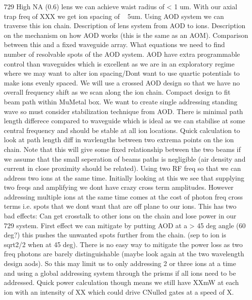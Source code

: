 \documentclass[12pt]{iopart}
\begin{document}
729 High NA (0.6) lens we can achieve waist radius of < 1 um.  With
our axial trap freq of XXX we get ion spacing of ~ 5um.  Using AOD
system we can traverse this ion chain.  Description of lens system
from AOD to ions.
Description on the mechanism on how AOD works (this is the same as an
AOM). Comparison between this and a fixed waveguide array. What
equations we need to find number of resolvable spots of the AOD
system. AOD have extra programmable control than waveguides which is
excellent as we are in an exploratory regime where we may want to
alter ion spacing/Dont want to use quartic potentials to make ions
evenly spaced.
We will use a crossed AOD design so that we have no overall frequency
shift as we scan along the ion chain.
Compact design to fit beam path within MuMetal box.
We want to create single addressing standing wave so must consider
stabilization technique from AOD. 
There is minimal path length differece compared to waveguide which is
ideal as we can stabilise at some central frequency and should be
stable at all ion locations.
Quick calculation to look at path length diff in wavlengths between
two extrema points on the ion chain. Note that this will give some
fixed relationship between the two beams if we assume that the small
seperation of beams paths is negligible (air density and current in
close proximity should be related).
Using two RF freq so that we can address two ions at the same
time. Initially looking at this we see that supplying two freqs and
amplifying we dont have crazy cross term amplitudes.
However addressing multiple ions at the same time comes at the cost of
photon freq cross terms i.e. spots that we dont want that are off
plane to our ions. This has two bad effects: Can get crosstalk to
other ions on the chain and lose power in our 729 system. First effect
we can mitigate by putting AOD at a > 45 deg angle (60 deg?) this
pushes the unwanted spots further from the chain. (sep to ion is
sqrt2/2 when at 45 deg). There is no easy way to mitigate the power
loss as two freq photons are barely distinguishable (maybe look again
at the two wavelength design aods). So this may limit us to only
addressing 2 or three ions at a time and using a global addressing
system through the prisms if all ions need to be addressed. Quick
power calculation though means we still have XXmW at each ion with an
intensity of XX which could drive CNulled gates at a speed of X.

\end{document}
